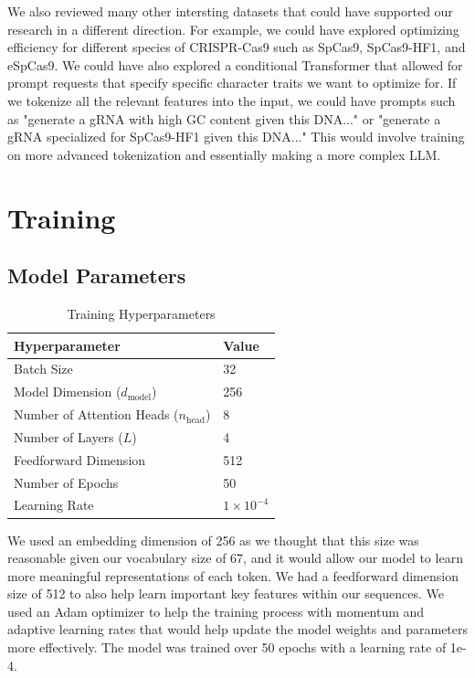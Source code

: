 \documentclass{article}
\begin{document}
We also reviewed many other intersting datasets that could have supported our research in a different direction. For example, we could have explored optimizing efficiency for different species of CRISPR-Cas9 such as SpCas9, SpCas9-HF1, and eSpCas9. We could have also explored a conditional Transformer that allowed for prompt requests that specify specific character traits we want to optimize for. If we tokenize all the relevant features into the input, we could have prompts such as "generate a gRNA with high GC content given this DNA..." or "generate a gRNA specialized for SpCas9-HF1 given this DNA..." This would involve training on more advanced tokenization and essentially making a more complex LLM. 

\section{Training}

\subsection{Model Parameters}

\begin{table}[H]
\centering
\caption{Training Hyperparameters}
\begin{tabular}{ll}
\toprule
\textbf{Hyperparameter} & \textbf{Value} \\
\midrule
Batch Size & 32 \\
Model Dimension ($d_{\text{model}}$) & 256 \\
Number of Attention Heads ($n_{\text{head}}$) & 8 \\
Number of Layers ($L$) & 4 \\
Feedforward Dimension & 512 \\
Number of Epochs & 50 \\
Learning Rate & $1 \times 10^{-4}$ \\
\bottomrule
\end{tabular}
\end{table}
We used an embedding dimension of 256 as we thought that this size was reasonable given our vocabulary size of 67, and it would allow our model to learn more meaningful representations of each token. We had a feedforward dimension size of 512 to also help learn important key features within our sequences. We used an Adam optimizer to help the training process with momentum and adaptive learning rates that would help update the model weights and parameters more effectively. The model was trained over 50 epochs with a learning rate of 1e-4.  
\end{document}
